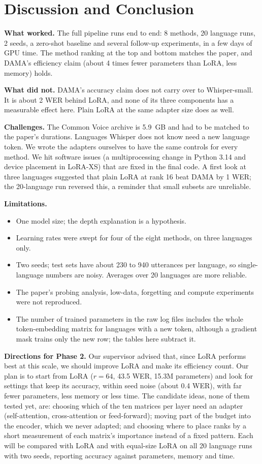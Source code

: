 \documentclass[11pt,a4paper]{article}
\begin{document}
\section{Discussion and Conclusion}
\textbf{What worked.} The full pipeline runs end to end: 8 methods, 20 language runs, 2 seeds, a zero-shot baseline and several follow-up experiments, in a few days of GPU time. The method ranking at the top and bottom matches the paper, and DAMA's efficiency claim (about 4 times fewer parameters than LoRA, less memory) holds.

\textbf{What did not.} DAMA's accuracy claim does not carry over to Whisper-small. It is about 2 WER behind LoRA, and none of its three components has a measurable effect here. Plain LoRA at the same adapter size does as well.

\textbf{Challenges.} The Common Voice archive is 5.9~GB and had to be matched to the paper's durations. Languages Whisper does not know need a new language token. We wrote the adapters ourselves to have the same controls for every method. We hit software issues (a multiprocessing change in Python 3.14 and device placement in LoRA-XS) that are fixed in the final code. A first look at three languages suggested that plain LoRA at rank 16 beat DAMA by 1 WER; the 20-language run reversed this, a reminder that small subsets are unreliable.

\textbf{Limitations.}
\begin{itemize}
\item One model size; the depth explanation is a hypothesis.
\item Learning rates were swept for four of the eight methods, on three languages only.
\item Two seeds; test sets have about 230 to 940 utterances per language, so single-language numbers are noisy. Averages over 20 languages are more reliable.
\item The paper's probing analysis, low-data, forgetting and compute experiments were not reproduced.
\item The number of trained parameters in the raw log files includes the whole token-embedding matrix for languages with a new token, although a gradient mask trains only the new row; the tables here subtract it.
\end{itemize}

\textbf{Directions for Phase 2.} Our supervisor advised that, since LoRA performs best at this scale, we should improve LoRA and make its efficiency count. Our plan is to start from LoRA ($r=64$, 43.5 WER, 15.3M parameters) and look for settings that keep its accuracy, within seed noise (about 0.4 WER), with far fewer parameters, less memory or less time. The candidate ideas, none of them tested yet, are: choosing which of the ten matrices per layer need an adapter (self-attention, cross-attention or feed-forward); moving part of the budget into the encoder, which we never adapted; and choosing where to place ranks by a short measurement of each matrix's importance instead of a fixed pattern. Each will be compared with LoRA and with equal-size LoRA on all 20 language runs with two seeds, reporting accuracy against parameters, memory and time.
\end{document}
